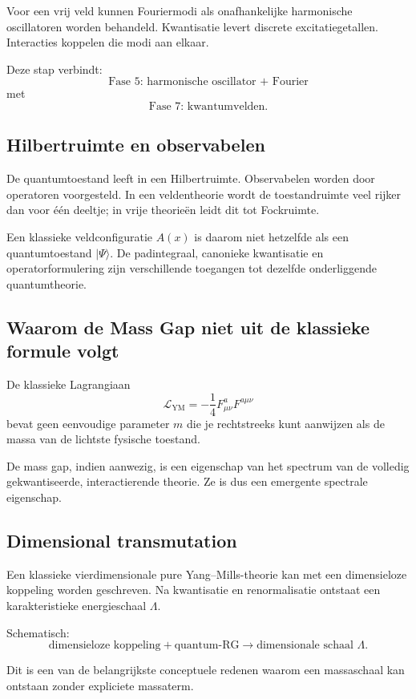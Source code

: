 \documentclass[11pt,a4paper]{article}
\begin{document}
Voor een vrij veld kunnen Fouriermodi als onafhankelijke harmonische oscillatoren worden behandeld. Kwantisatie levert discrete excitatiegetallen. Interacties koppelen die modi aan elkaar.

Deze stap verbindt:
\[
\text{Fase 5: harmonische oscillator + Fourier}
\]
met
\[
\text{Fase 7: kwantumvelden}.
\]

\subsection{Hilbertruimte en observabelen}

De quantumtoestand leeft in een Hilbertruimte. Observabelen worden door operatoren voorgesteld. In een veldentheorie wordt de toestandruimte veel rijker dan voor één deeltje; in vrije theorieën leidt dit tot Fockruimte.

Een klassieke veldconfiguratie $A(x)$ is daarom niet hetzelfde als een quantumtoestand $|\Psi\rangle$. De padintegraal, canonieke kwantisatie en operatorformulering zijn verschillende toegangen tot dezelfde onderliggende quantumtheorie.

\subsection{Waarom de Mass Gap niet uit de klassieke formule volgt}

De klassieke Lagrangiaan
\[
\mathcal{L}_{\mathrm{YM}}=-\frac14F^a_{\mu\nu}F^{a\mu\nu}
\]
bevat geen eenvoudige parameter $m$ die je rechtstreeks kunt aanwijzen als de massa van de lichtste fysische toestand.

De mass gap, indien aanwezig, is een eigenschap van het spectrum van de volledig gekwantiseerde, interactierende theorie. Ze is dus een emergente spectrale eigenschap.

\subsection{Dimensional transmutation}

Een klassieke vierdimensionale pure Yang--Mills-theorie kan met een dimensieloze koppeling worden geschreven. Na kwantisatie en renormalisatie ontstaat een karakteristieke energieschaal $\Lambda$.

Schematisch:
\[
\text{dimensieloze koppeling} + \text{quantum-RG}
\longrightarrow
\text{dimensionale schaal }\Lambda.
\]

Dit is een van de belangrijkste conceptuele redenen waarom een massaschaal kan ontstaan zonder expliciete massaterm.
\end{document}
